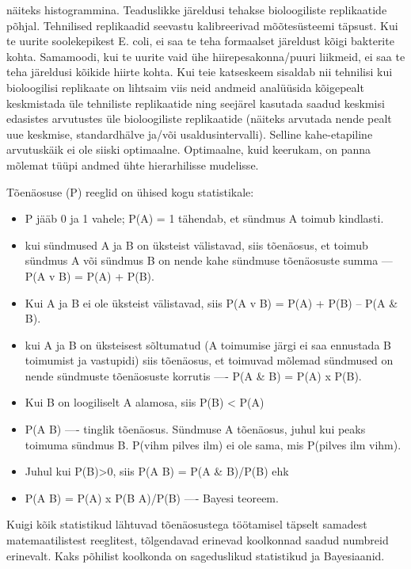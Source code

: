 \documentclass[]{book}
\providecommand{\tightlist}{%
  \setlength{\itemsep}{0pt}\setlength{\parskip}{0pt}}
\begin{document}
\begin{itemize}
  näiteks histogrammina. Teaduslikke järeldusi tehakse bioloogiliste
  replikaatide põhjal. Tehnilised replikaadid seevastu kalibreerivad
  mõõtesüsteemi täpsust. Kui te uurite soolekepikest E. coli, ei saa te
  teha formaalset järeldust kõigi bakterite kohta. Samamoodi, kui te
  uurite vaid ühe hiirepesakonna/puuri liikmeid, ei saa te teha
  järeldusi kõikide hiirte kohta. Kui teie katseskeem sisaldab nii
  tehnilisi kui bioloogilisi replikaate on lihtsaim viis neid andmeid
  analüüsida kõigepealt keskmistada üle tehniliste replikaatide ning
  seejärel kasutada saadud keskmisi edasistes arvutustes üle
  bioloogiliste replikaatide (näiteks arvutada nende pealt uue keskmise,
  standardhälve ja/või usaldusintervalli). Selline kahe-etapiline
  arvutuskäik ei ole siiski optimaalne. Optimaalne, kuid keerukam, on
  panna mõlemat tüüpi andmed ühte hierarhilisse mudelisse.
\end{itemize}

Tõenäosuse (P) reeglid on ühised kogu statistikale:

\begin{itemize}
\tightlist
\item
  P jääb 0 ja 1 vahele; P(A) = 1 tähendab, et sündmus A toimub
  kindlasti.
\item
  kui sündmused A ja B on üksteist välistavad, siis tõenäosus, et toimub
  sündmus A või sündmus B on nende kahe sündmuse tõenäosuste summa ---
  P(A v B) = P(A) + P(B).
\item
  Kui A ja B ei ole üksteist välistavad, siis P(A v B) = P(A) + P(B) --
  P(A \& B).
\item
  kui A ja B on üksteisest sõltumatud (A toimumise järgi ei saa
  ennustada B toimumist ja vastupidi) siis tõenäosus, et toimuvad
  mõlemad sündmused on nende sündmuste tõenäosuste korrutis ---- P(A \&
  B) = P(A) x P(B).
\item
  Kui B on loogiliselt A alamosa, siis P(B) \textless{} P(A)
\item
  P(A \textbar{} B) ---- tinglik tõenäosus. Sündmuse A tõenäosus, juhul
  kui peaks toimuma sündmus B. P(vihm \textbar{} pilves ilm) ei ole
  sama, mis P(pilves ilm \textbar{} vihm).
\item
  Juhul kui P(B)\textgreater{}0, siis P(A \textbar{} B) = P(A \& B)/P(B)
  ehk
\item
  P(A \textbar{} B) = P(A) x P(B \textbar{} A)/P(B) ---- Bayesi teoreem.
\end{itemize}

Kuigi kõik statistikud lähtuvad tõenäosustega töötamisel täpselt
samadest matemaatilistest reeglitest, tõlgendavad erinevad koolkonnad
saadud numbreid erinevalt. Kaks põhilist koolkonda on sageduslikud
statistikud ja Bayesiaanid.
\end{document}
